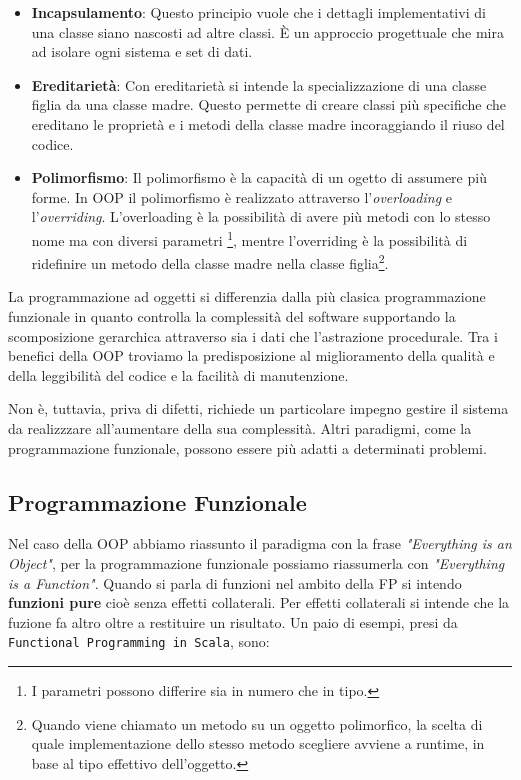 \documentclass[12pt,a4paper,openright,twoside]{book}
\begin{document}
\begin{itemize}
    \item \textbf{Incapsulamento}: Questo principio vuole che i dettagli implementativi di una classe siano nascosti ad altre classi. È un approccio progettuale che mira ad isolare ogni sistema e set di dati. 
    \item \textbf{Ereditarietà}: Con ereditarietà si intende la specializzazione di una classe figlia da una classe madre. Questo permette di creare classi più specifiche che ereditano le proprietà e i metodi della classe madre incoraggiando il riuso del codice.
    \item \textbf{Polimorfismo}: Il polimorfismo è la capacità di un ogetto di assumere più forme. In OOP il polimorfismo è realizzato attraverso l'\textit{overloading} e l'\textit{overriding}. L'overloading è la possibilità di avere più metodi con lo stesso nome ma con diversi parametri \footnote{I parametri possono differire sia in numero che in tipo.}, mentre l'overriding è la possibilità di ridefinire un metodo della classe madre nella classe figlia\footnote{Quando viene chiamato un metodo su un oggetto polimorfico, la scelta di quale implementazione dello stesso metodo scegliere avviene a runtime, in base al tipo effettivo dell'oggetto.}.
\end{itemize}

La programmazione ad oggetti si differenzia dalla più clasica programmazione funzionale in quanto controlla la complessità del software supportando la scomposizione gerarchica attraverso sia i dati che l'astrazione procedurale.
Tra i benefici della OOP troviamo la predisposizione al miglioramento della qualità e della leggibilità del codice e la facilità di manutenzione.

Non è, tuttavia, priva di difetti, richiede un particolare impegno gestire il sistema da realizzzare all'aumentare della sua complessità. Altri paradigmi, come la programmazione funzionale, possono essere più adatti a determinati problemi.

\subsection{Programmazione Funzionale}
Nel caso della OOP abbiamo riassunto il paradigma con la frase \textit{"Everything is an Object"}, per la programmazione funzionale possiamo riassumerla con \textit{"Everything is a Function"}. Quando si parla di funzioni nel ambito della \ac{FP} si intendo \textbf{funzioni pure} cioè senza effetti collaterali. Per effetti collaterali si intende che la fuzione fa altro oltre a restituire un risultato. Un paio di esempi, presi da \texttt{Functional Programming in Scala}, sono:
\end{document}
